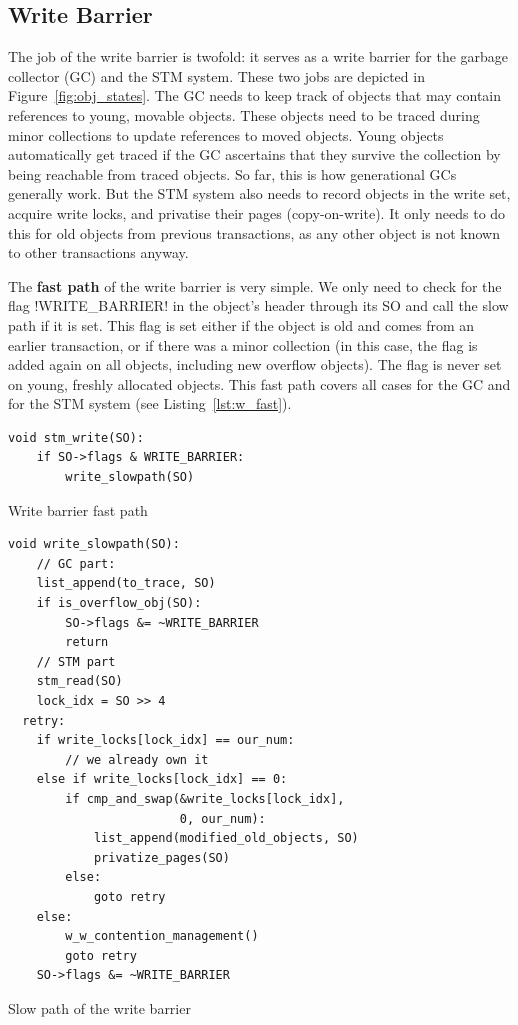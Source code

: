 \documentclass{sigplanconf}
\makeatletter
\renewcommand\lstinline[1][]{%
  \Collectverb{\@@myverb}%
}
\def\@@myverb#1{%
    \begingroup
    \fboxsep=0.2em
    \colorbox{verylightgray}{\oldlstinline|#1|}%
    \endgroup
}
\makeatother
\begin{document}
\subsection{Write Barrier}

The job of the write barrier is twofold: it serves as a write barrier
for the garbage collector (GC) and the STM system. These two jobs are
depicted in Figure~\ref{fig:obj_states}. The GC needs to keep track of
objects that may contain references to young, movable objects. These
objects need to be traced during minor collections to update
references to moved objects. Young objects automatically get traced if
the GC ascertains that they survive the collection by being reachable
from traced objects. So far, this is how generational GCs generally
work. But the STM system also needs to record objects in the
write set, acquire write locks, and privatise their pages
(copy-on-write). It only needs to do this for old objects from
previous transactions, as any other object is not known to other
transactions anyway.

The \textbf{fast path} of the write barrier is very simple. We only
need to check for the flag \lstinline!WRITE_BARRIER! in the object's
header through its SO and call the slow path if it is set. This flag
is set either if the object is old and comes from an earlier
transaction, or if there was a minor collection (in this case, the flag
is added again on all objects, including new overflow objects). The flag
is never set on young, freshly allocated objects. This fast path
covers all cases for the GC and for the STM system (see
Listing~\ref{lst:w_fast}).

\begin{code}[h]
\begin{lstlisting}
void stm_write(SO):
	if SO->flags & WRITE_BARRIER:
		write_slowpath(SO)
\end{lstlisting}
\caption{Write barrier fast path\label{lst:w_fast}}
\end{code}

\begin{code}[h]
\begin{lstlisting}
void write_slowpath(SO):
	// GC part:
	list_append(to_trace, SO)
	if is_overflow_obj(SO):
		SO->flags &= ~WRITE_BARRIER
		return
	// STM part
	stm_read(SO)
	lock_idx = SO >> 4
  retry:
	if write_locks[lock_idx] == our_num:
		// we already own it
	else if write_locks[lock_idx] == 0:
		if cmp_and_swap(&write_locks[lock_idx],
					    0, our_num):
			list_append(modified_old_objects, SO)
			privatize_pages(SO)
		else:
			goto retry
	else:
		w_w_contention_management()
		goto retry
	SO->flags &= ~WRITE_BARRIER
\end{lstlisting}

\caption{Slow path of the write barrier\label{lst:w_slow}}
\end{code}
\end{document}

